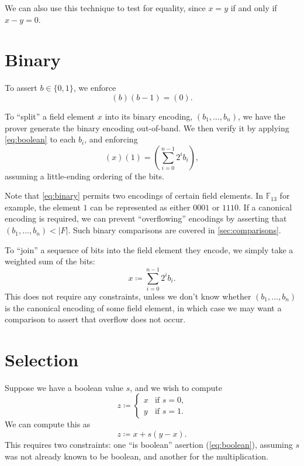 \documentclass{article}
\begin{document}
We can also use this technique to test for equality, since $x = y$ if and only if $x - y = 0$.


\section{Binary}

To assert $b \in \{ 0, 1 \}$, we enforce
\begin{equation} \label{eq:boolean}
  (b) (b - 1) = (0).
\end{equation}

To ``split'' a field element $x$ into its binary encoding, $(b_1, \dots, b_n)$, we have the prover generate the binary encoding out-of-band. We then verify it by applying \autoref{eq:boolean} to each $b_i$, and enforcing
\begin{equation} \label{eq:binary}
  (x) (1) = \left( \sum_{i=0}^{n-1} 2^i b_i \right),
\end{equation}
assuming a little-ending ordering of the bits.

Note that \autoref{eq:binary} permits two encodings of certain field elements. In $\mathbb{F}_{13}$ for example, the element $1$ can be represented as either $0001$ or $1110$. If a canonical encoding is required, we can prevent ``overflowing'' encodings by asserting that $(b_1, \dots, b_n) < |F|$. Such binary comparisons are covered in \autoref{sec:comparisons}.

To ``join'' a sequence of bits into the field element they encode, we simply take a weighted sum of the bits:
\begin{equation} \label{eq:join}
  x \coloneqq \sum_{i=0}^{n-1} 2^i b_i.
\end{equation}
This does not require any constraints, unless we don't know whether $(b_1, \dots, b_n)$ is the canonical encoding of some field element, in which case we may want a comparison to assert that overflow does not occur.


\section{Selection} \label{sec:selection}

Suppose we have a boolean value $s$, and we wish to compute
\begin{equation}
  z \coloneqq
  \begin{cases}
    x & \text{if $s = 0$,} \\
    y & \text{if $s = 1$.}
  \end{cases}
\end{equation}
We can compute this as
\begin{equation} \label{eq:selection}
  z \coloneqq x + s(y - x).
\end{equation}
This requires two constraints: one ``is boolean'' asertion (\autoref{eq:boolean}), assuming $s$ was not already known to be boolean, and another for the multiplication.
\end{document}
